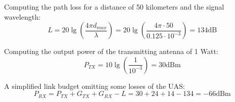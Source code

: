 Computing the path loss for a distance of 50 kilometers and the signal wavelength:
\begin{equation*}\label{eq:tech_parameters3}
	L = 20\lg\left (\frac{4\pi d_{max}}{\lambda} \right)
	  = 20\lg\left (\frac{4\pi \cdot 50}{0.125\cdot 10^{-3}} \right)
	  = 134 \text{dB} 
\end{equation*}

Computing the output power of the transmitting antenna of 1 Watt:
\begin{equation*}\label{eq:tech_parameters4}
	P_{TX} = 10\lg\left (\frac{1}{10^{-3}} \right)  
	       = 30 \text{dBm}
\end{equation*}


A simplified link budget omitting some losses of the UAS:
\begin{equation*}\label{eq:tech_parameters5}
	P_{RX} = P_{TX} + G_{TX} + G_{RX} - L  
	       = 30 + 24 + 14 - 134 = -66 \text{dBm}
\end{equation*}